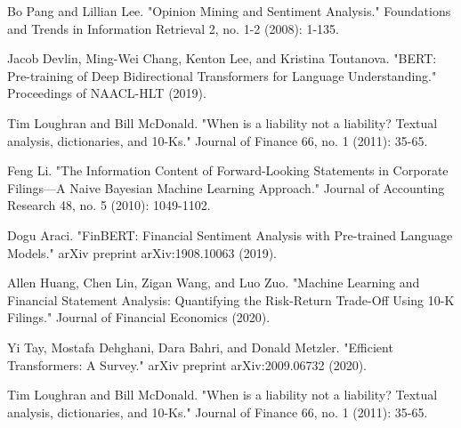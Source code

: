 \documentclass[12pt]{article}
\begin{document}
\begin{thebibliography}{}
Bo Pang and Lillian Lee. "Opinion Mining and Sentiment Analysis." Foundations and Trends in Information Retrieval 2, no. 1-2 (2008): 1-135.

Jacob Devlin, Ming-Wei Chang, Kenton Lee, and Kristina Toutanova. "BERT: Pre-training of Deep Bidirectional Transformers for Language Understanding." Proceedings of NAACL-HLT (2019).

Tim Loughran and Bill McDonald. "When is a liability not a liability? Textual analysis, dictionaries, and 10-Ks." Journal of Finance 66, no. 1 (2011): 35-65.

Feng Li. "The Information Content of Forward-Looking Statements in Corporate Filings—A Naive Bayesian Machine Learning Approach." Journal of Accounting Research 48, no. 5 (2010): 1049-1102.

Dogu Araci. "FinBERT: Financial Sentiment Analysis with Pre-trained Language Models." arXiv preprint arXiv:1908.10063 (2019).

Allen Huang, Chen Lin, Zigan Wang, and Luo Zuo. "Machine Learning and Financial Statement Analysis: Quantifying the Risk-Return Trade-Off Using 10-K Filings." Journal of Financial Economics (2020).

Yi Tay, Mostafa Dehghani, Dara Bahri, and Donald Metzler. "Efficient Transformers: A Survey." arXiv preprint arXiv:2009.06732 (2020).

Tim Loughran and Bill McDonald. "When is a liability not a liability? Textual analysis, dictionaries, and 10-Ks." Journal of Finance 66, no. 1 (2011): 35-65.


\end{thebibliography}
\end{document}
